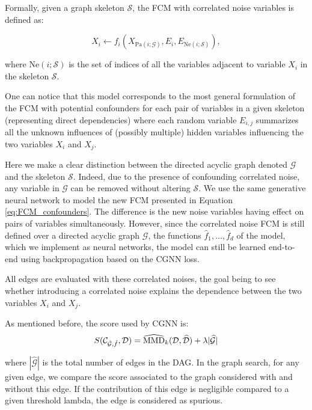 \documentclass[a4paper, 11pt]{article}
\newcommand{\Pa}[1]{\text{Pa}({#1}; \mathcal{G})}
\newcommand{\Ne}[1]{\text{Ne}({#1}; \mathcal{S})}
\begin{document}
Formally, given a graph skeleton $\mathcal{S}$, the FCM with correlated noise variables is defined as:

\begin{equation}
    \label{eq:FCM_confounders}
    X_i \leftarrow f_i(X_{\Pa{i}}, E_i, E_{\Ne{i}}),
\end{equation}

where $\Ne{i}$ is the set of indices of all the variables adjacent to variable $X_i$ in the skeleton $\mathcal{S}$. 

One can notice that this model corresponds to the most general formulation of the FCM with potential confounders for each pair of variables in a given skeleton (representing direct dependencies) where each random variable $E_{i,j}$ summarizes all the unknown influences of (possibly multiple) hidden variables  influencing the two variables $X_i$ and $X_j$.



Here we make a clear distinction between the directed acyclic graph denoted $\mathcal{G}$ and the skeleton $\mathcal{S}$. Indeed, due to the presence of confounding correlated noise, any variable in $\mathcal{G}$ can be removed without altering $\mathcal{S}$. We use the same generative neural network to model the new FCM presented in Equation \ref{eq:FCM_confounders}. The difference is the new noise variables having effect on pairs of variables  simultaneously. However, since the correlated noise FCM is still defined over a directed acyclic graph $\mathcal{G}$, the functions $\hat{f}_1, \ldots, \hat{f}_d$ of the model, which we implement as neural networks, the model can still be learned end-to-end using backpropagation based on the CGNN loss.   

All edges are evaluated with these correlated noises, the goal being to see whether introducing a correlated noise explains the dependence between the two variables $X_i$ and $X_j$. 

As mentioned before, the score used by CGNN is:
\begin{equation}
  S(\mathcal{C}_{\hat{\cal G},\hat{f}}, \mathcal{D}) =
   \widehat{\text{MMD}}_k(\mathcal{D}, \widehat{\mathcal{D}}) + \lambda 
    |\widehat{\mathcal{G}}|
  \label{loss_cgnn}
\end{equation}

where $|\widehat{\mathcal{G}}|$ is the total number of edges in the DAG. 
In the graph search, for any given edge, we compare the score associated to the graph considered with and without this edge. If the contribution of this edge is negligible compared to a given threshold lambda, the edge is considered as spurious.
\end{document}
